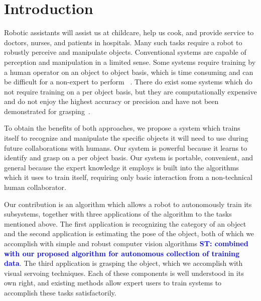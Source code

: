 \documentclass[conference]{IEEEtran}
\newcommand{\stnote}[1]{\textcolor{Blue}{\textbf{ST: #1}}}
\begin{document}

\section{Introduction}
Robotic assistants will assist us at childcare, help us cook, and provide service to
doctors, nurses, and patients in hospitals. Many such tasks require a robot to
robustly perceive and manipulate objects. 
Conventional systems are capable of perception and manipulation in a limited sense.
Some systems require training by a human operator on an object to object basis, which 
is time consuming and can be difficult for a non-expert to perform ~\citep{ork14, lai11, lai11a}. There 
do exist some systems which
do not require training on a per object basis, but they are computationally expensive and do not enjoy the
highest accuracy or precision and have not been demonstrated for grasping~\citep{guadarrama14}.

To obtain the benefits of both approaches, we propose a system which trains itself 
to recognize and manipulate the specific objects it will need to use during future
collaborations with humans. 
Our system is powerful because it learns to identify and grasp on 
a per object basis. Our system is portable, convenient, and general because the expert knowledge it employs
is built into the algorithms which it uses to train itself, requiring only basic
interaction from a non-technical human collaborator.

Our contribution is an algorithm which allows a robot to autonomously
train its subsystems, together with three applications of the
algorithm to the tasks mentioned above.  The first application is
recognizing the category of an object and the second application is
estimating the pose of the object, both of which we accomplish with
simple and robust computer vision algorithms \stnote{combined with our
  proposed algorithm for autonomous collection of training data}. The
third application is grasping the object, which we accomplish with
visual servoing techniques. Each of these components is well
understood in its own right, and existing methods allow expert users
to train systems to accomplish these tasks satisfactorily.
\end{document}
